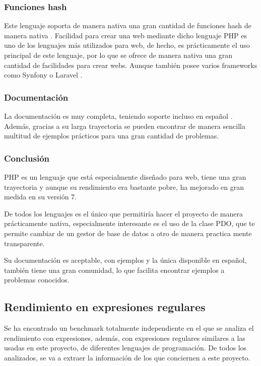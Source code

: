 \subsubsection{Funciones hash}
Este lenguaje soporta de manera nativa una gran cantidad de funciones hash de manera nativa \cite{php_hash}. 
Facilidad para crear una web mediante dicho lenguaje
PHP es uno de los lenguajes más utilizados para web, de hecho, es prácticamente el uso principal de este lenguaje, por lo que se ofrece de manera nativa una gran cantidad de facilidades para crear webs. 
Aunque también posee varios frameworks como Synfony \cite{php_Symfony} o Laravel \cite{php_laravel}.

\subsubsection{Documentación}
La documentación es muy completa, teniendo soporte incluso en español \cite{php_docu}. Además, gracias a su larga trayectoria se pueden encontrar de manera sencilla multitud de ejemplos prácticos para una gran cantidad de problemas. 

\subsubsection{Conclusión}
PHP es un lenguaje que está especialmente diseñado para web, tiene una gran trayectoria y aunque su rendimiento era bastante pobre, ha mejorado en gran medida en su versión 7.\cite{php_Benchmark}

De todos los lenguajes es el único que permitiría hacer el proyecto de manera prácticamente nativa, especialmente interesante es el uso de la clase PDO, que te permite cambiar de un gestor de base de datos a otro de manera practica mente transparente. 

Su documentación es aceptable, con ejemplos y la única disponible en español, también tiene una gran comunidad, lo que facilita encontrar ejemplos a problemas conocidos. 

\subsection{Rendimiento en expresiones regulares}
Se ha encontrado un benchmark \cite{regex_benchmark} totalmente independiente en el que se analiza el rendimiento con expresiones, además, con expresiones regulares similares a las usadas en este proyecto, de diferentes lenguajes de programación.  De todos los analizados, se va a extraer la información de los que conciernen a este proyecto. 

